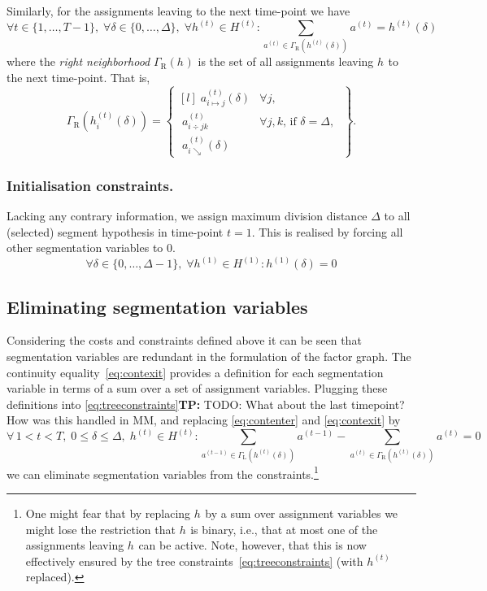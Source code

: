 \documentclass[a4paper]{article}
\newcommand{\TP}[1]{{\color{Red}\sc \textbf{TP:} #1}{}}
\newcommand{\set}[1]{\ensuremath{\{#1\}}}
\newcommand{\hypset}[1]{\ensuremath{H^{(#1)}}\xspace}
\newcommand{\vhset}[1]{\hypset{#1}}
\newcommand{\Ht}[1][t]{\vhset{#1}}
\newcommand{\vh}[1][]{\ensuremath{h_{#1}}\xspace}
\newcommand{\vht}[1][t]{\ensuremath{h^{(#1)}}\xspace}
\newcommand{\vhtd}[2][t]{\ensuremath{h^{(#1)}\left({#2}\right)}\xspace}
\newcommand{\vhtid}[3][t]{\ensuremath{h^{(#1)}_{#2}\left({#3}\right)}\xspace}
\newcommand{\vat}[1][t]{\ensuremath{a^{(#1)}}\xspace}
\newcommand{\vamd}[4]{\ensuremath{a^{(#1)}_{#2\mapsto#3}\left(#4\right)}\xspace}
\newcommand{\vad}[3]{\ensuremath{a^{(#1)}_{#2\div#3}}\xspace}
\newcommand{\vaed}[3]{\ensuremath{a^{(#1)}_{#2\searrow}\left(#3\right)}\xspace}
\newcommand{\Gr}[1]{\ensuremath{\Gamma_{\text{R}}\left(#1\right)}\xspace}
\newcommand{\Gl}[1]{\ensuremath{\Gamma_{\text{L}}\left(#1\right)}\xspace}
\newcommand{\ie}{i.e.{}}
\begin{document}
\noindent
Similarly, for the assignments leaving to the next time-point we have
\begin{equation}\label{eq:contexit}
  \forall t \in \set{1, \dots, T-1},\;
  \forall \delta \in \set{0,\dots,\Delta},\;
  \forall \vht \in \Ht:
    \sum_{\vat \in \Gr{\vhtd{\delta}}} \vat
  = \vhtd{\delta}
\end{equation}
where the \emph{right neighborhood} \Gr{\vh} is the set of all assignments leaving \vh to the next time-point.
That is,
\begin{equation}
	\Gr{\vhtid{i}{\delta}}
	= \begin{Bmatrix*}[l]
			\; \vamd{t}{i}{j}{\delta}   & \forall j, \\[4mm]
			\; \vad{t}{i}{jk}           & \forall j, k \text{, if } \delta = \Delta,\; \\[4mm]
			\; \vaed{t}{i}{\delta} & 
		\end{Bmatrix*}.
\end{equation}
%
%
\subsubsection{Initialisation constraints.}
%
%
Lacking any contrary information, we assign maximum division distance $\Delta$ to all (selected) segment hypothesis in time-point $t = 1$. This is realised by forcing all other segmentation variables to $0$.
\begin{equation}
	\forall \delta \in \set{0,\dots,\Delta-1},\;
	\forall \vht[1] \in \Ht[1]:
		\vhtd[1]{\delta} = 0
\end{equation}

%
%
\subsection{Eliminating segmentation variables}
\label{sec:varelim}
%
Considering the costs and constraints defined above it can be seen that segmentation variables are redundant in the formulation of the factor graph.
The continuity equality~\eqref{eq:contexit} provides a definition for each segmentation variable in terms of a sum over a set of assignment variables.
Plugging these definitions into \eqref{eq:treeconstraints}\TP{TODO: What about the last timepoint? How was this handled in MM}, and replacing \eqref{eq:contenter} and \eqref{eq:contexit} by
\begin{equation}
  \forall\, 1 < t < T,\; 0 \le \delta \le \Delta,\; \vht \in \Ht:
    \!\!\!\!\!
    \sum_{\vat[t-1] \in \Gl{\vhtd{\delta}}}
    \!\!\!\!\!
      \vat[t-1]
  -
    \!\!\!\!\!
    \sum_{\vat \in \Gr{\vhtd{\delta}}}
    \!\!\!\!\!
      \vat = 0
\end{equation}
we can eliminate segmentation variables from the constraints.\footnote{%
One might fear that by replacing \vh by a sum over assignment variables we might lose the restriction that \vh is binary, \ie, that at most one of the
  assignments leaving \vh can be active.
Note, however, that this is now effectively ensured by the tree constraints~\eqref{eq:treeconstraints} (with \vht replaced).}
\end{document}
